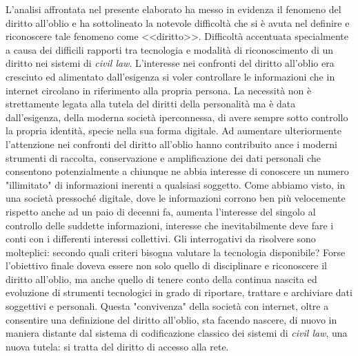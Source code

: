 L'analisi affrontata nel presente elaborato ha messo in evidenza il fenomeno del diritto all'oblio e ha sottolineato la notevole difficoltà che si è avuta nel definire e riconoscere tale fenomeno come <<diritto>>.
Difficoltà accentuata specialmente a causa dei difficili rapporti tra tecnologia e modalità di riconoscimento di un diritto nei sistemi di \textit{civil law}.
L'interesse nei confronti del diritto all'oblio era cresciuto ed alimentato dall'esigenza si voler controllare le informazioni che in internet circolano in riferimento alla propria persona. La necessità non è strettamente legata alla tutela del diritti della personalità ma è data dall'esigenza, della moderna società iperconnessa, di avere sempre sotto controllo la propria identità, specie nella sua forma digitale.
Ad aumentare ulteriormente l'attenzione nei confronti del diritto all'oblio hanno contribuito ance i moderni strumenti di raccolta, conservazione e amplificazione dei dati personali che consentono potenzialmente a chiunque ne abbia interesse di conoscere un numero "illimitato" di informazioni inerenti a qualsiasi soggetto.
Come abbiamo visto, in una società pressoché digitale, dove le informazioni corrono ben più velocemente rispetto anche ad un paio di decenni fa, aumenta l'interesse del singolo al controllo delle suddette informazioni, interesse che inevitabilmente deve fare i conti con i differenti interessi collettivi.
Gli interrogativi da risolvere sono molteplici: secondo quali criteri bisogna valutare la tecnologia disponibile? Forse l'obiettivo finale doveva essere non solo quello di disciplinare e riconoscere il diritto all'oblio, ma anche quello di tenere conto della continua nascita ed evoluzione di strumenti tecnologici in grado di riportare, trattare e archiviare dati soggettivi e personali.
Questa "convivenza" della società con internet, oltre a consentire una definizione del diritto all'oblio, sta facendo nascere, di nuovo in maniera distante dal sistema di codificazione classico dei sistemi di \textit{civil law}, una nuova tutela: si tratta del diritto di accesso alla rete.
